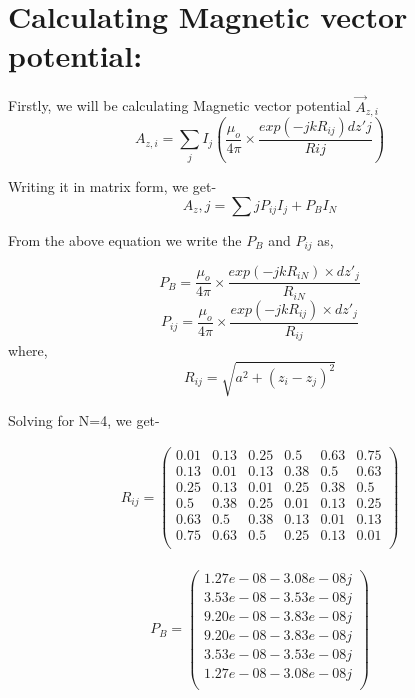\documentclass[12pt]{article}
\begin{document}
\newpage
\section*{Calculating Magnetic vector potential:}

Firstly, we will be calculating Magnetic vector potential $\overrightarrow{A}_{z,i}$
\[A_{z,i} = \sum_{j} I_j\left(\frac{\mu_{o}}{4\pi} \times \frac {exp(-jk R_{ij})dz'j}{R{ij}}\right)\]

Writing it in matrix form, we get-
\[A_z,j = \sum{j} P_{ij} I_j + P_B I_N \]

From the above equation we write the $P_B$ and $P_{ij}$ as,

\[P_B =  \frac{\mu_{o}}{4\pi} \times \frac {exp(-jk R_{iN}) \times dz'_j}{R_{iN}}\]
\[P_{ij} =  \frac{\mu_{o}}{4\pi} \times \frac {exp(-jk R_{ij}) \times dz'_j}{R_{ij}}\]
where, \[ R_{ij} = \sqrt{a^2 + (z_i - z_j)^2} \]

Solving for N=4, we get-

\begin{gather*}
    R_{ij}
    =
    \begin{pmatrix}
    0.01& 0.13& 0.25& 0.5 & 0.63& 0.75\\
    0.13& 0.01& 0.13& 0.38& 0.5 & 0.63\\
    0.25& 0.13& 0.01& 0.25& 0.38& 0.5 \\
    0.5 & 0.38& 0.25& 0.01& 0.13& 0.25\\
    0.63& 0.5 & 0.38& 0.13& 0.01& 0.13\\
    0.75& 0.63& 0.5 & 0.25& 0.13& 0.01\\
    \end{pmatrix}
\end{gather*}

\begin{gather*}
    P_{B}
    =
    \begin{pmatrix}
    1.27e-08-3.08e-08j\\
    3.53e-08-3.53e-08j\\
    9.20e-08-3.83e-08j\\
    9.20e-08-3.83e-08j\\
    3.53e-08-3.53e-08j\\
    1.27e-08-3.08e-08j\\
    \end{pmatrix}
\end{gather*}
\end{document}
